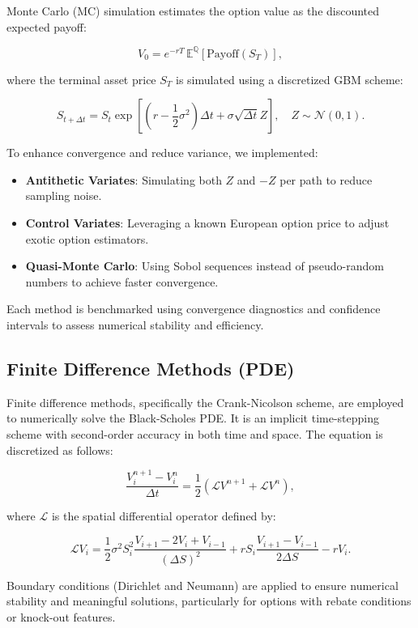 \documentclass[12pt,a4paper]{article}
\begin{document}
Monte Carlo (MC) simulation estimates the option value as the discounted expected payoff:

\[
V_0 = e^{-rT} \, \mathbb{E}^{\mathbb{Q}}[\text{Payoff}(S_T)],
\]

where the terminal asset price \( S_T \) is simulated using a discretized GBM scheme:

\[
S_{t+\Delta t} = S_t \exp \left[ \left( r - \frac{1}{2}\sigma^2 \right) \Delta t + \sigma \sqrt{\Delta t} Z \right],
\quad Z \sim \mathcal{N}(0,1).
\]

To enhance convergence and reduce variance, we implemented:

\begin{itemize}
  \item \textbf{Antithetic Variates}: Simulating both \( Z \) and \( -Z \) per path to reduce sampling noise.
  \item \textbf{Control Variates}: Leveraging a known European option price to adjust exotic option estimators.
  \item \textbf{Quasi-Monte Carlo}: Using Sobol sequences instead of pseudo-random numbers to achieve faster convergence.
\end{itemize}

Each method is benchmarked using convergence diagnostics and confidence intervals to assess numerical stability and efficiency.


\subsection{Finite Difference Methods (PDE)}
Finite difference methods, specifically the Crank-Nicolson scheme, are employed to numerically solve the Black-Scholes PDE. It is an implicit time-stepping scheme with second-order accuracy in both time and space. The equation is discretized as follows:

\[
\frac{V_i^{n+1} - V_i^n}{\Delta t} = \frac{1}{2} \left( \mathcal{L} V^{n+1} + \mathcal{L} V^n \right),
\]

where \( \mathcal{L} \) is the spatial differential operator defined by:

\[
\mathcal{L} V_i = \frac{1}{2} \sigma^2 S_i^2 \frac{V_{i+1} - 2V_i + V_{i-1}}{(\Delta S)^2} + r S_i \frac{V_{i+1} - V_{i-1}}{2 \Delta S} - r V_i.
\]

Boundary conditions (Dirichlet and Neumann) are applied to ensure numerical stability and meaningful solutions, particularly for options with rebate conditions or knock-out features.
\end{document}
